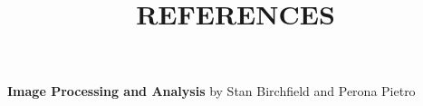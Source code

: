 \documentclass[11pt]{article}
\begin{document}
\title{REFERENCES}
    \item \textbf{Image Processing and Analysis} by Stan Birchfield and Perona Pietro
\maketitle
\end{document}
